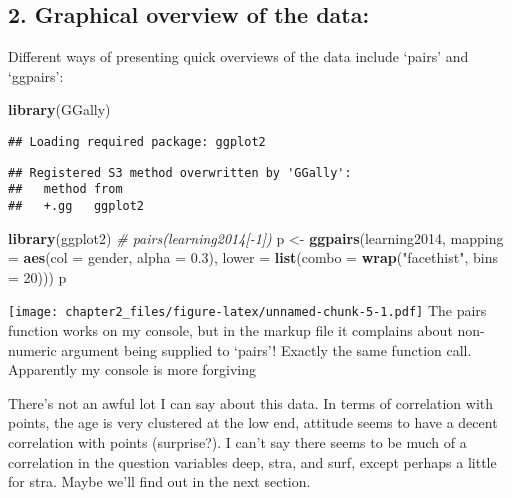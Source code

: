\documentclass[
]{article}
\newenvironment{Shaded}{\begin{snugshade}}{\end{snugshade}}
\newcommand{\CommentTok}[1]{\textcolor[rgb]{0.56,0.35,0.01}{\textit{#1}}}
\newcommand{\DataTypeTok}[1]{\textcolor[rgb]{0.13,0.29,0.53}{#1}}
\newcommand{\DecValTok}[1]{\textcolor[rgb]{0.00,0.00,0.81}{#1}}
\newcommand{\FloatTok}[1]{\textcolor[rgb]{0.00,0.00,0.81}{#1}}
\newcommand{\KeywordTok}[1]{\textcolor[rgb]{0.13,0.29,0.53}{\textbf{#1}}}
\newcommand{\NormalTok}[1]{#1}
\newcommand{\StringTok}[1]{\textcolor[rgb]{0.31,0.60,0.02}{#1}}
\begin{document}
\hypertarget{graphical-overview-of-the-data}{%
\subsection{2. Graphical overview of the
data:}\label{graphical-overview-of-the-data}}

Different ways of presenting quick overviews of the data include `pairs'
and `ggpairs':

\begin{Shaded}
\begin{Highlighting}[]
\KeywordTok{library}\NormalTok{(GGally)}
\end{Highlighting}
\end{Shaded}

\begin{verbatim}
## Loading required package: ggplot2
\end{verbatim}

\begin{verbatim}
## Registered S3 method overwritten by 'GGally':
##   method from   
##   +.gg   ggplot2
\end{verbatim}

\begin{Shaded}
\begin{Highlighting}[]
\KeywordTok{library}\NormalTok{(ggplot2)}
\CommentTok{# pairs(learning2014[-1])}
\NormalTok{p <-}\StringTok{ }\KeywordTok{ggpairs}\NormalTok{(learning2014, }\DataTypeTok{mapping =} \KeywordTok{aes}\NormalTok{(}\DataTypeTok{col =}\NormalTok{ gender, }\DataTypeTok{alpha =} \FloatTok{0.3}\NormalTok{), }\DataTypeTok{lower =} \KeywordTok{list}\NormalTok{(}\DataTypeTok{combo =} \KeywordTok{wrap}\NormalTok{(}\StringTok{"facethist"}\NormalTok{, }\DataTypeTok{bins =} \DecValTok{20}\NormalTok{)))}
\NormalTok{p}
\end{Highlighting}
\end{Shaded}

\texttt{[image: chapter2\_files/figure-latex/unnamed-chunk-5-1.pdf]} The
pairs function works on my console, but in the markup file it complains
about non-numeric argument being supplied to `pairs'! Exactly the same
function call. Apparently my console is more forgiving

There's not an awful lot I can say about this data. In terms of
correlation with points, the age is very clustered at the low end,
attitude seems to have a decent correlation with points (surprise?). I
can't say there seems to be much of a correlation in the question
variables deep, stra, and surf, except perhaps a little for stra. Maybe
we'll find out in the next section.
\end{document}
